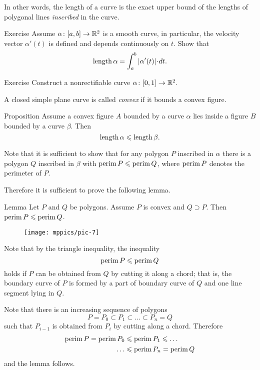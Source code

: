 In other words, the length of a curve is the exact upper bound of the lengths of polygonal lines \emph{inscribed} in the curve.

\begin{thm}{Exercise}
Assume $\alpha\colon[a,b]\to\mathbb{R}^2$ is a smooth curve, in particular, the velocity vector $\alpha'(t)$ is defined and depends continuously on $t$.
Show that
\[\length \alpha=\int_a^b|\alpha'(t)|\cdot dt.\]
\end{thm}

\begin{thm}{Exercise}\label{ex:nonrectifiable-curve}
Construct a nonrectifiable curve $\alpha\colon[0,1]\to\mathbb{R}^2$.
\end{thm}

A closed simple plane curve is called \emph{convex} if it bounds a convex figure.

\begin{thm}{Proposition}\label{prop:convex-curve}
Assume a convex figure $A$ bounded by a curve $\alpha$ lies inside a figure $B$ bounded by a curve $\beta$.
Then
\[\mathop{\rm length}\nolimits\alpha\leqslant \mathop{\rm length}\nolimits\beta.\]
\end{thm}

Note that it is sufficient to show that for any polygon  $P$ inscribed in $\alpha$ there is a polygon $Q$ inscribed in $\beta$ with  
$\mathop{\rm perim}\nolimits P\leqslant \mathop{\rm perim}\nolimits Q$, where $\mathop{\rm perim}\nolimits P$ denotes the perimeter of $P$.

Therefore it is sufficient to prove the following lemma.

\begin{thm}{Lemma}\label{lem:perimeter}
Let $P$ and $Q$ be polygons.
Assume $P$ is convex and $Q\supset P$.
Then $\mathop{\rm perim}\nolimits P\leqslant \mathop{\rm perim}\nolimits Q$.
\end{thm}

\begin{wrapfigure}{r}{24 mm}
\vskip-4mm
\centering
\texttt{[image: mppics/pic-7]}
\end{wrapfigure}

Note that by the triangle inequality,
the inequality
\[\mathop{\rm perim}\nolimits P\leqslant \mathop{\rm perim}\nolimits Q\]
holds
if $P$ can be obtained from $Q$ by cutting it along a chord;
that is, the boundary curve of $P$ is formed by a part of boundary curve of $Q$ and one line segment lying in $Q$.

Note that there is an increasing sequence of polygons 
$$P=P_0\subset P_1\subset\dots\subset P_n=Q$$
such that $P_{i-1}$ is obtained from $P_{i}$ by cutting along a chord.
Therefore 
\begin{align*}
\mathop{\rm perim}\nolimits P=\mathop{\rm perim}\nolimits P_0&\leqslant\mathop{\rm perim}\nolimits P_1\leqslant\dots
\\
\dots&\leqslant\mathop{\rm perim}\nolimits P_n=\mathop{\rm perim}\nolimits Q
\end{align*}
and the lemma follows.
\qeds

